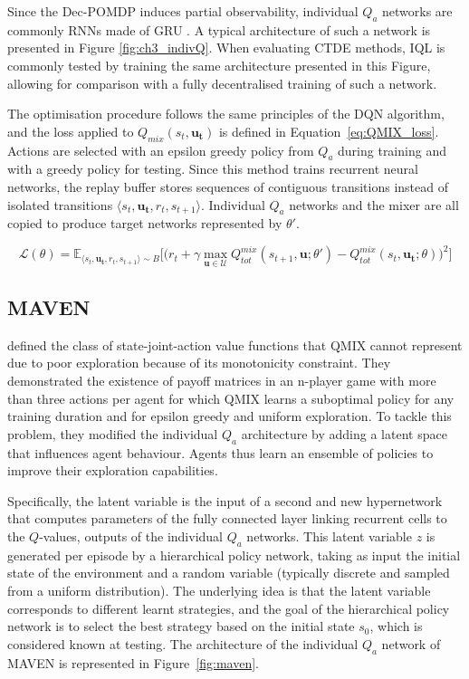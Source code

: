 Since the Dec-POMDP induces partial observability, individual $Q_a$ networks are commonly RNNs made of GRU \citep{Chung2014EmpiricalModeling}.
A typical architecture of such a network is presented in Figure \ref{fig:ch3_indivQ}.
When evaluating CTDE methods, IQL is commonly tested by training the same architecture presented in this Figure, allowing for comparison with a fully decentralised training of such a network.

The optimisation procedure follows the same principles of the DQN algorithm, and the loss applied to $Q_{mix}(s_t, \mathbf{u_t})$ is defined in Equation~\ref{eq:QMIX_loss}.
Actions are selected with an epsilon greedy policy from $Q_a$ during training and with a greedy policy for testing.
Since this method trains recurrent neural networks, the replay buffer stores sequences of contiguous transitions instead of isolated transitions $\langle s_{t},\mathbf{u_{t}},r_{t},s_{t+1}\rangle$.
Individual $Q_a$ networks and the mixer are all copied to produce target networks represented by $\theta'$.

\begin{equation}
    \mathcal{L}(\theta) = \mathbb{E}_{\langle s_{t},\mathbf{u_{t}},r_{t},s_{t+1} \rangle \sim B}
    \bigg[  
    \big(r_{t} + \gamma \max_{\mathbf{u} \in \mathcal{U}} Q_{tot}^{mix}(s_{t+1}, \mathbf{u}; \theta')
    - Q_{tot}^{mix}(s_{t}, \mathbf{u_{t}}; \theta)\big)^{2}
    \bigg] 
    \label{eq:QMIX_loss}
\end{equation}

\subsection{MAVEN}
\citet{Mahajan2019MAVEN:Exploration} defined the class of state-joint-action value functions that QMIX cannot represent due to poor exploration because of its monotonicity constraint.
They demonstrated the existence of payoff matrices in an n-player game with more than three actions per agent for which QMIX learns a suboptimal policy for any training duration and for epsilon greedy and uniform exploration.
To tackle this problem, they modified the individual $Q_a$ architecture by adding a latent space that influences agent behaviour.
Agents thus learn an ensemble of policies to improve their exploration capabilities.

Specifically, the latent variable is the input of a second and new hypernetwork that computes parameters of the fully connected layer linking recurrent cells to the $Q$-values, outputs of the individual $Q_a$ networks.
This latent variable $z$ is generated per episode by a hierarchical policy network, taking as input the initial state of the environment and a random variable (typically discrete and sampled from a uniform distribution).
The underlying idea is that the latent variable corresponds to different learnt strategies, and the goal of the hierarchical policy network is to select the best strategy based on the initial state $s_0$, which is considered known at testing.
The architecture of the individual $Q_a$ network of MAVEN is represented in Figure~\ref{fig:maven}.

